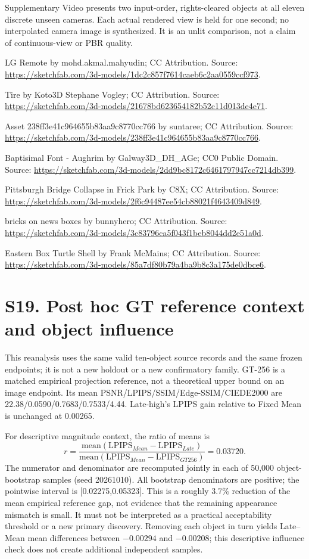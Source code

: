 \documentclass[11pt]{article}
\begin{document}
Supplementary Video presents two input-order, rights-cleared objects at all eleven discrete unseen cameras. Each actual rendered view is held for one second; no interpolated camera image is synthesized. It is an unlit comparison, not a claim of continuous-view or PBR quality.

LG Remote by mohd.akmal.mahyudin; CC Attribution. Source: \url{https://sketchfab.com/3d-models/1dc2c857f7614caeb6c2aa0559ccf973}.

Tire by Koto3D Stephane Vogley; CC Attribution. Source: \url{https://sketchfab.com/3d-models/21678bd623654182b52c11d013de4e71}.

Asset 238ff3e41c964655b83aa9c8770cc766 by suntaree; CC Attribution. Source: \url{https://sketchfab.com/3d-models/238ff3e41c964655b83aa9c8770cc766}.

Baptisimal Font - Aughrim by Galway3D\_DH\_AGe; CC0 Public Domain. Source: \url{https://sketchfab.com/3d-models/2dd9bc8172c6461797947cc7214db399}.

Pittsburgh Bridge Collapse in Frick Park by C8X; CC Attribution. Source: \url{https://sketchfab.com/3d-models/2f6c94487ee54cb88021f4643409d849}.

bricks on news boxes by bunnyhero; CC Attribution. Source: \url{https://sketchfab.com/3d-models/3c83796ca5f043f1beb8044dd2e51a0d}.

Eastern Box Turtle Shell by Frank McMains; CC Attribution. Source: \url{https://sketchfab.com/3d-models/85a7df80b79a4ba9b8c3a175de0dbce6}.


\clearpage
\section*{S19. Post hoc GT reference context and object influence}
This reanalysis uses the same valid ten-object source records and the same frozen endpoints; it is not a new holdout or a new confirmatory family. GT-256 is a matched empirical projection reference, not a theoretical upper bound on an image endpoint. Its mean PSNR/LPIPS/SSIM/Edge-SSIM/CIEDE2000 are 22.38/0.0590/0.7683/0.7533/4.44. Late-high's LPIPS gain relative to Fixed Mean is unchanged at 0.00265.

For descriptive magnitude context, the ratio of means is
\[
 r=\frac{\mathrm{mean}(\mathrm{LPIPS}_{Mean}-\mathrm{LPIPS}_{Late})}{\mathrm{mean}(\mathrm{LPIPS}_{Mean}-\mathrm{LPIPS}_{GT256})}=0.03720.
\]
The numerator and denominator are recomputed jointly in each of 50,000 object-bootstrap samples (seed 20261010). All bootstrap denominators are positive; the pointwise interval is [0.02275,0.05323]. This is a roughly 3.7\% reduction of the mean empirical reference gap, not evidence that the remaining appearance mismatch is small. It must not be interpreted as a practical acceptability threshold or a new primary discovery. Removing each object in turn yields Late--Mean mean differences between $-0.00294$ and $-0.00208$; this descriptive influence check does not create additional independent samples.
\end{document}
